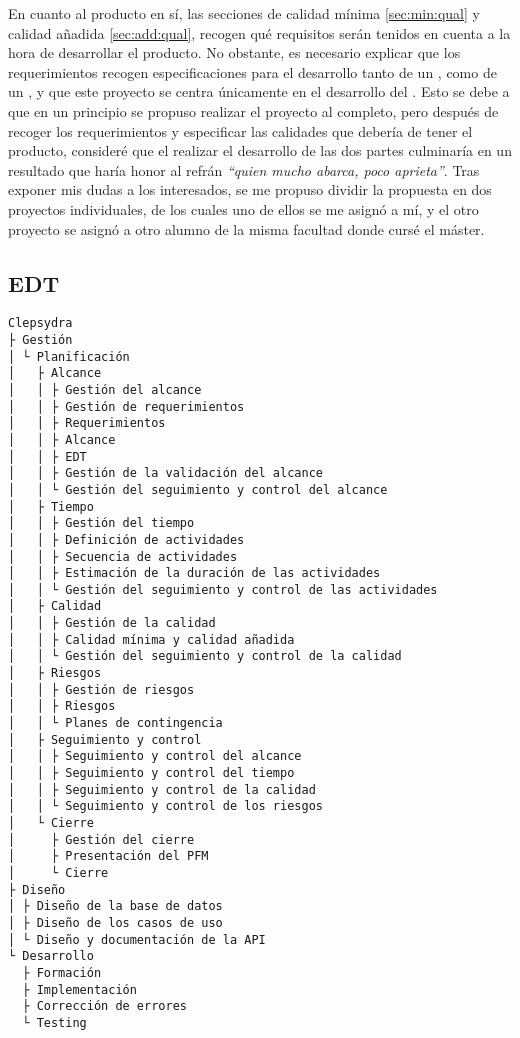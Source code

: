 En cuanto al producto en sí, las secciones de calidad mínima \ref{sec:min:qual}
y calidad añadida \ref{sec:add:qual}, recogen qué requisitos serán tenidos en
cuenta a la hora de desarrollar el producto. No obstante, es necesario explicar
que los requerimientos recogen especificaciones para el desarrollo tanto de
un , como de un , y que
este proyecto se centra únicamente en el desarrollo del
. Esto se debe a que en un principio se propuso
realizar el proyecto al completo, pero después de recoger los requerimientos
y especificar las calidades que debería de tener el producto, consideré que
el realizar el desarrollo de las dos partes culminaría en un resultado que
haría honor al refrán \textit{``quien mucho abarca, poco aprieta''}. Tras
exponer mis dudas a los interesados, se me propuso dividir la propuesta en
dos proyectos individuales, de los cuales uno de ellos se me asignó a mí, y
el otro proyecto se asignó a otro alumno de la misma facultad donde cursé
el máster.

\subsection{EDT}
\begin{verbatim}
Clepsydra
├ Gestión
│ └ Planificación
│   ├ Alcance
│   │ ├ Gestión del alcance
│   │ ├ Gestión de requerimientos
│   │ ├ Requerimientos
│   │ ├ Alcance
│   │ ├ EDT
│   │ ├ Gestión de la validación del alcance
│   │ └ Gestión del seguimiento y control del alcance
│   ├ Tiempo
│   │ ├ Gestión del tiempo
│   │ ├ Definición de actividades
│   │ ├ Secuencia de actividades
│   │ ├ Estimación de la duración de las actividades
│   │ └ Gestión del seguimiento y control de las actividades
│   ├ Calidad
│   │ ├ Gestión de la calidad
│   │ ├ Calidad mínima y calidad añadida
│   │ └ Gestión del seguimiento y control de la calidad
│   ├ Riesgos
│   │ ├ Gestión de riesgos
│   │ ├ Riesgos
│   │ └ Planes de contingencia
│   ├ Seguimiento y control
│   │ ├ Seguimiento y control del alcance
│   │ ├ Seguimiento y control del tiempo
│   │ ├ Seguimiento y control de la calidad
│   │ └ Seguimiento y control de los riesgos
│   └ Cierre
│     ├ Gestión del cierre
│     ├ Presentación del PFM
│     └ Cierre
├ Diseño
│ ├ Diseño de la base de datos
│ ├ Diseño de los casos de uso
│ └ Diseño y documentación de la API
└ Desarrollo
  ├ Formación
  ├ Implementación
  ├ Corrección de errores
  └ Testing
\end{verbatim}

